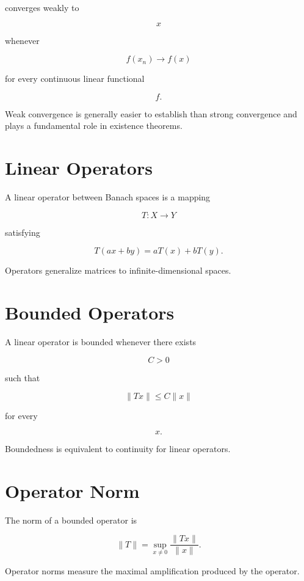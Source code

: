 \documentclass[11pt,fleqn]{book}
\numberwithin{equation}{chapter}
\theoremstyle{plain}
\theoremstyle{definition}
\theoremstyle{remark}
\begin{document}
converges weakly to

\[
x
\]

whenever

\[
\boxed{
f(x_n)
\rightarrow
f(x)
}
\]

for every continuous linear functional

\[
f.
\]

Weak convergence is generally easier to establish than strong
convergence and plays a fundamental role in existence theorems.


\section{Linear Operators}

A linear operator between Banach spaces is a mapping

\[
T:X\rightarrow Y
\]

satisfying

\[
T(ax+by)
=
aT(x)
+
bT(y).
\]

Operators generalize matrices to infinite-dimensional spaces.


\section{Bounded Operators}

A linear operator is bounded whenever there exists

\[
C>0
\]

such that

\[
\boxed{
\|Tx\|
\le
C
\|x\|
}
\]

for every

\[
x.
\]

Boundedness is equivalent to continuity for linear operators.


\section{Operator Norm}

The norm of a bounded operator is

\[
\boxed{
\|T\|
=
\sup_{x\neq0}
\frac{\|Tx\|}{\|x\|}.
}
\]

Operator norms measure the maximal amplification produced by the
operator.
\end{document}
